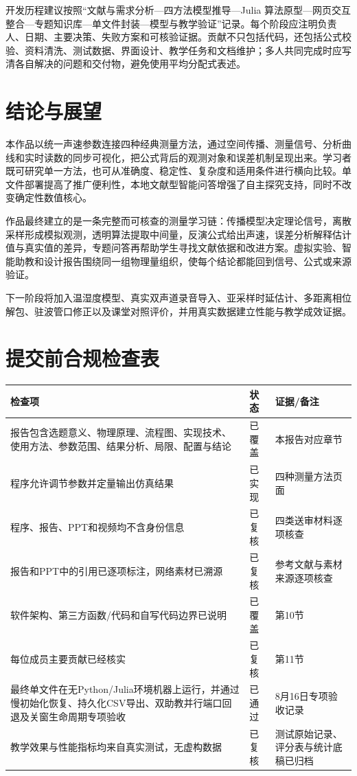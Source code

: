 \documentclass[UTF8,a4paper,zihao=-4]{ctexart}
\begin{document}
开发历程建议按照“文献与需求分析—四方法模型推导—Julia 算法原型—网页交互整合—专题知识库—单文件封装—模型与教学验证”记录。每个阶段应注明负责人、日期、主要决策、失败方案和可核验证据。贡献不只包括代码，还包括公式校验、资料清洗、测试数据、界面设计、教学任务和文档维护；多人共同完成时应写清各自解决的问题和交付物，避免使用平均分配式表述。

\section{结论与展望}
本作品以统一声速参数连接四种经典测量方法，通过空间传播、测量信号、分析曲线和实时读数的同步可视化，把公式背后的观测对象和误差机制呈现出来。学习者既可研究单一方法，也可从准确度、稳定性、复杂度和适用条件进行横向比较。单文件部署提高了推广便利性，本地文献型智能问答增强了自主探究支持，同时不改变确定性数值核心。

作品最终建立的是一条完整而可核查的测量学习链：传播模型决定理论信号，离散采样形成模拟观测，透明算法提取中间量，反演公式给出声速，误差分析解释估计值与真实值的差异，专题问答再帮助学生寻找文献依据和改进方案。虚拟实验、智能助教和设计报告围绕同一组物理量组织，使每个结论都能回到信号、公式或来源验证。

下一阶段将加入温湿度模型、真实双声道录音导入、亚采样时延估计、多距离相位解包、驻波管口修正以及课堂对照评价，并用真实数据建立性能与教学成效证据。




\appendix
\section{提交前合规检查表}
\begin{longtable}{p{8.2cm}p{1.8cm}p{4.0cm}}
\toprule
检查项 & 状态 & 证据/备注\\
\midrule
报告包含选题意义、物理原理、流程图、实现技术、使用方法、参数范围、结果分析、局限、配置与结论 & 已覆盖 & 本报告对应章节\\
程序允许调节参数并定量输出仿真结果 & 已实现 & 四种测量方法页面\\
程序、报告、PPT和视频均不含身份信息 & 已复核 & 四类送审材料逐项核查\\
报告和PPT中的引用已逐项标注，网络素材已溯源 & 已复核 & 参考文献与素材来源逐项核查\\
软件架构、第三方函数/代码和自写代码边界已说明 & 已覆盖 & 第10节\\
每位成员主要贡献已经核实 & 已复核 & 第11节\\
最终单文件在无Python/Julia环境机器上运行，并通过慢初始化恢复、持久化CSV导出、双助教并行端口回退及关窗生命周期专项验收 & 已通过 & 8月16日专项验收记录\\
教学效果与性能指标均来自真实测试，无虚构数据 & 已复核 & 测试原始记录、评分表与统计底稿已归档\\
\bottomrule
\end{longtable}
\end{document}
